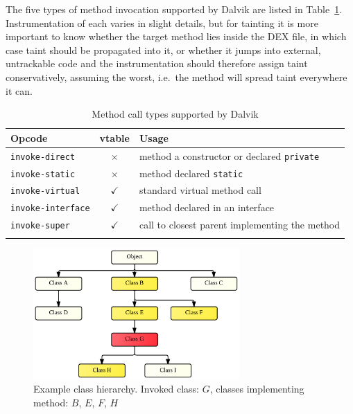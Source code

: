 \documentclass[12pt,twoside,notitlepage]{report}
\newcommand{\tick}{$\checkmark$}
\newcommand{\cross}{$\times$}
\begin{document}
The five types of method invocation supported by Dalvik are listed in Table~\ref{table:TaintPropagation_MethodCallTypes}. Instrumentation of each varies in slight details, but for tainting it is more important to know whether the target method lies inside the DEX file, in which case taint should be propagated into it, or whether it jumps into external, untrackable code and the instrumentation should therefore assign taint conservatively, assuming the worst, i.e.\ the method will spread taint everywhere it can.

\begin{table}[h]
	\begin{center}
	\begin{tabular}{|l|c|l|}
		\firsthline
		\textbf{Opcode}         & \footnotesize{\textbf{vtable}} & \textbf{Usage} \\
		\hline
		\verb$invoke-direct$    & \cross          & method a constructor or declared \verb$private$ \\
		\verb$invoke-static$    & \cross          & method declared \verb$static$ \\
		\hline
		\verb$invoke-virtual$   & \tick           & standard virtual method call \\
		\verb$invoke-interface$ & \tick           & method declared in an interface \\
		\verb$invoke-super$     & \tick           & call to closest parent implementing the method \\
		\lasthline
	\end{tabular}
	\end{center}
	\caption{Method call types supported by Dalvik}
	\label{table:TaintPropagation_MethodCallTypes}
\end{table}

\begin{figure}
	\centerline{	
		\includegraphics[width=0.7\textwidth]{figs/fig_virtual_call_tree.png}
	}
	\caption[Example class hierarchy]{Example class hierarchy. Invoked class: $G$, classes implementing method: $B$, $E$, $F$, $H$}
	\label{fig:TaintPropagation_DestDecision_ClassHierarchy}
\end{figure}
\end{document}
